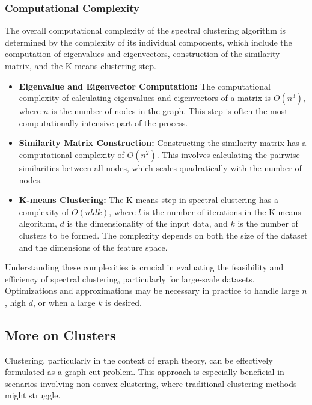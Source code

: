 \documentclass[unicode,11pt,a4paper,oneside,numbers=endperiod,openany]{scrartcl}
\begin{document}
\subsubsection{Computational Complexity}

The overall computational complexity of the spectral clustering algorithm is determined by the complexity of its individual components, which include the computation of eigenvalues and eigenvectors, construction of the similarity matrix, and the K-means clustering step.

\begin{itemize}
    \item \textbf{Eigenvalue and Eigenvector Computation:} The computational complexity of calculating eigenvalues and eigenvectors of a matrix is \( O(n^3) \), where \( n \) is the number of nodes in the graph. This step is often the most computationally intensive part of the process.

    \item \textbf{Similarity Matrix Construction:} Constructing the similarity matrix has a computational complexity of \( O(n^2) \). This involves calculating the pairwise similarities between all nodes, which scales quadratically with the number of nodes.

    \item \textbf{K-means Clustering:} The K-means step in spectral clustering has a complexity of \( O(nldk) \), where \( l \) is the number of iterations in the K-means algorithm, \( d \) is the dimensionality of the input data, and \( k \) is the number of clusters to be formed. The complexity depends on both the size of the dataset and the dimensions of the feature space.
\end{itemize}

Understanding these complexities is crucial in evaluating the feasibility and efficiency of spectral clustering, particularly for large-scale datasets. Optimizations and approximations may be necessary in practice to handle large \( n \), high \( d \), or when a large \( k \) is desired.

\subsection{More on Clusters}

Clustering, particularly in the context of graph theory, can be effectively formulated as a graph cut problem. This approach is especially beneficial in scenarios involving non-convex clustering, where traditional clustering methods might struggle.
\end{document}
